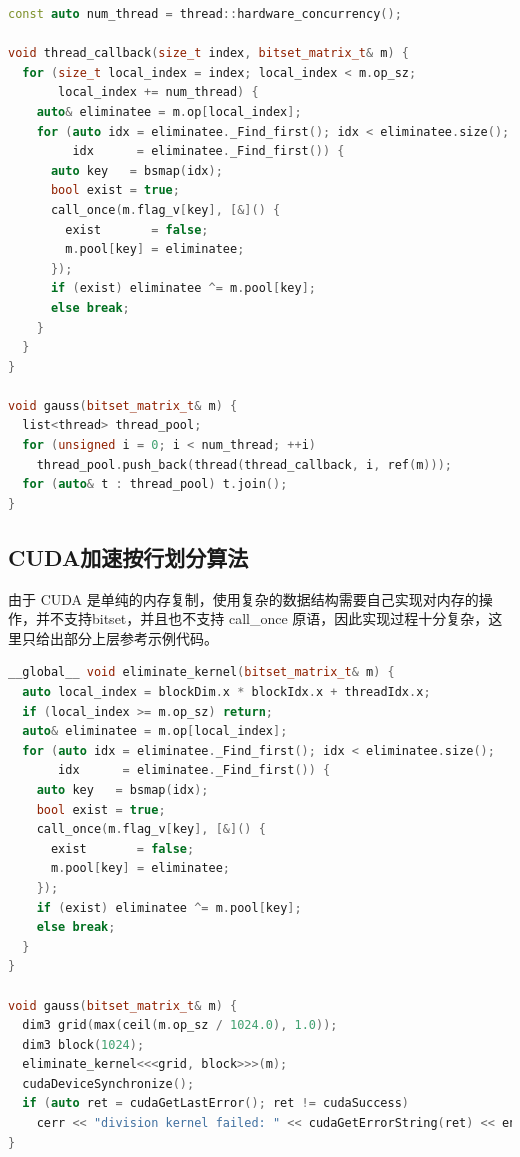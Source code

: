 \documentclass[a4paper]{article}
\begin{document}
\begin{lstlisting}[frame=trbl, language={C++}, caption={call\_once 位元矩阵消元部分}, label={code:call-once}]
const auto num_thread = thread::hardware_concurrency();

void thread_callback(size_t index, bitset_matrix_t& m) {
  for (size_t local_index = index; local_index < m.op_sz;
       local_index += num_thread) {
    auto& eliminatee = m.op[local_index];
    for (auto idx = eliminatee._Find_first(); idx < eliminatee.size();
         idx      = eliminatee._Find_first()) {
      auto key   = bsmap(idx);
      bool exist = true;
      call_once(m.flag_v[key], [&]() {
        exist       = false;
        m.pool[key] = eliminatee;
      });
      if (exist) eliminatee ^= m.pool[key];
      else break;
    }
  }
}

void gauss(bitset_matrix_t& m) {
  list<thread> thread_pool;
  for (unsigned i = 0; i < num_thread; ++i)
    thread_pool.push_back(thread(thread_callback, i, ref(m)));
  for (auto& t : thread_pool) t.join();
}
\end{lstlisting}

\subsection{CUDA加速按行划分算法}
由于 CUDA 是单纯的内存复制，使用复杂的数据结构需要自己实现对内存的操作，并不支持bitset，并且也不支持 call\_once 原语，因此实现过程十分复杂，这里只给出部分上层参考示例代码。
\begin{lstlisting}[frame=trbl, language={C++}, caption={call\_once 位元矩阵消元部分}, label={code:cuda-row}]
__global__ void eliminate_kernel(bitset_matrix_t& m) {
  auto local_index = blockDim.x * blockIdx.x + threadIdx.x;
  if (local_index >= m.op_sz) return;
  auto& eliminatee = m.op[local_index];
  for (auto idx = eliminatee._Find_first(); idx < eliminatee.size();
       idx      = eliminatee._Find_first()) {
    auto key   = bsmap(idx);
    bool exist = true;
    call_once(m.flag_v[key], [&]() {
      exist       = false;
      m.pool[key] = eliminatee;
    });
    if (exist) eliminatee ^= m.pool[key];
    else break;
  }
}

void gauss(bitset_matrix_t& m) {
  dim3 grid(max(ceil(m.op_sz / 1024.0), 1.0));
  dim3 block(1024);
  eliminate_kernel<<<grid, block>>>(m);
  cudaDeviceSynchronize();
  if (auto ret = cudaGetLastError(); ret != cudaSuccess)
    cerr << "division kernel failed: " << cudaGetErrorString(ret) << endl;
}
\end{lstlisting}
\end{document}
